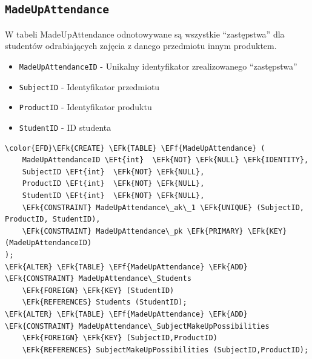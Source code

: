 \documentclass[11pt]{article}
\newcommand{\EFk}[1]{\textcolor{EFk}{\textbf{#1}}} %
\newcommand{\EFf}[1]{\textcolor{EFf}{#1}} %
\newcommand{\EFt}[1]{\textcolor{EFt}{\textbf{#1}}} %
\begin{document}
\subsection{\texttt{MadeUpAttendance}}
\label{sec:org9782807}
W tabeli MadeUpAttendance odnotowywane są wszystkie ``zastępstwa'' dla studentów odrabiających 
zajęcia z danego przedmiotu innym produktem.
\begin{itemize}
\item \texttt{MadeUpAttendanceID} - Unikalny identyfikator zrealizowanego ``zastępstwa''
\item \texttt{SubjectID} - Identyfikator przedmiotu
\item \texttt{ProductID} - Identyfikator produktu
\item \texttt{StudentID} - ID studenta
\end{itemize}
\begin{Code}
\begin{Verbatim}
\color{EFD}\EFk{CREATE} \EFk{TABLE} \EFf{MadeUpAttendance} (
    MadeUpAttendanceID \EFt{int}  \EFk{NOT} \EFk{NULL} \EFk{IDENTITY},
    SubjectID \EFt{int}  \EFk{NOT} \EFk{NULL},
    ProductID \EFt{int}  \EFk{NOT} \EFk{NULL},
    StudentID \EFt{int}  \EFk{NOT} \EFk{NULL},
    \EFk{CONSTRAINT} MadeUpAttendance\_ak\_1 \EFk{UNIQUE} (SubjectID, ProductID, StudentID),
    \EFk{CONSTRAINT} MadeUpAttendance\_pk \EFk{PRIMARY} \EFk{KEY}  (MadeUpAttendanceID)
);
\EFk{ALTER} \EFk{TABLE} \EFf{MadeUpAttendance} \EFk{ADD} \EFk{CONSTRAINT} MadeUpAttendance\_Students
    \EFk{FOREIGN} \EFk{KEY} (StudentID)
    \EFk{REFERENCES} Students (StudentID);
\EFk{ALTER} \EFk{TABLE} \EFf{MadeUpAttendance} \EFk{ADD} \EFk{CONSTRAINT} MadeUpAttendance\_SubjectMakeUpPossibilities
    \EFk{FOREIGN} \EFk{KEY} (SubjectID,ProductID)
    \EFk{REFERENCES} SubjectMakeUpPossibilities (SubjectID,ProductID);
\end{Verbatim}
\end{Code}
\end{document}
